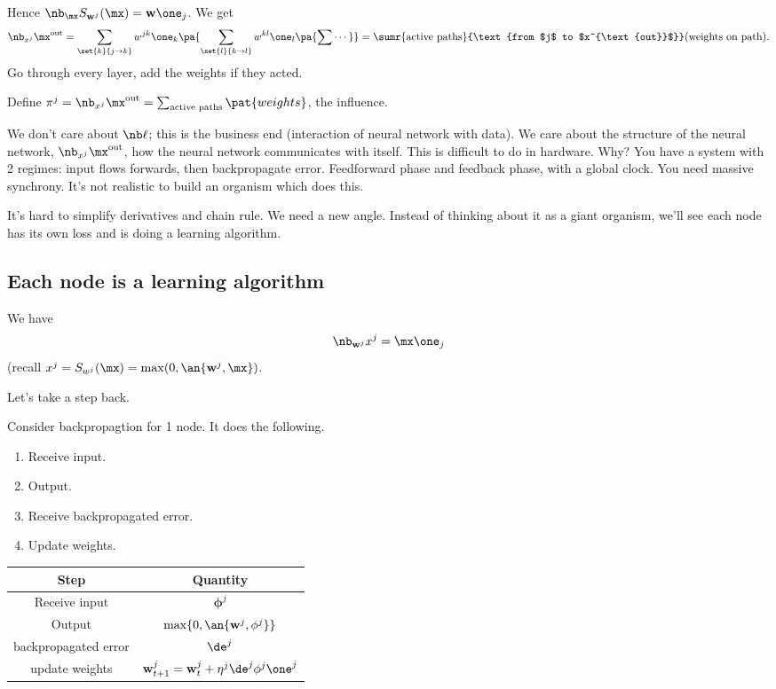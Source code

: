 Hence $\nb_{\mx} S_{\mathbf w^j}(\mx)=\mathbf w\one_j$.
We get
\[
\nb_{x^j} \mx^{\text{out}}= \sum_{\set{k}{j\to k}} w^{jk} \one_k \pa{\sum_{\set{l}{k\to l}} w^{kl}\one_l\pa{\sum\cdots}}=\sumr{\text{active paths}}{\text{from $j$ to $x^{\text{out}}$}} (\text{weights on path}). 
\]
Go through every layer, add the weights if they acted.

Define $\mathbf \pi^j=\nb_{x^j} \mx^{\text{out}}= \sum_{\text{active paths}}\pat{weights}$, the influence.

We don't care about $\nb \ell$; this is the business end (interaction of neural network with data). We care about the structure of the neural network, $\nb_{x^j}\mx^{\text{out}}$, how the neural network communicates with itself. %
This is difficult to do in hardware. Why? You have a system with 2 regimes: input flows forwards, then backpropagate error. Feedforward phase and feedback phase, with a global clock. You need massive synchrony. It's not realistic to build an organism which does this.

It's hard to simplify derivatives and chain rule. We need a new angle. Instead of thinking about it as a giant organism, we'll see each node has its own loss and is doing a learning algorithm.

\subsection{Each node is a learning algorithm}

We have 
\[
\nb_{\mathbf w^j} x^j = \mx \one_{j}
\]
(recall $x^j=S_{w^j}(\mx)=\max(0,\an{\mathbf w^j,\mx})$.

Let's take a step back. 

Consider backpropagtion for 1 node. 
It does the following.
\begin{enumerate}
\item
Receive input.
\item
Output.
\item 
Receive backpropagated error.
\item Update weights.
\end{enumerate}

%
\begin{tabular}{|c|c|}
\hline 
Step & Quantity\tabularnewline
\hline 
Receive input & $\mathbf{\phi}^{j}$\tabularnewline
\hline 
Output & $\max\{0,\an{\mathbf w^j, \mathbf \phi^j}\}$\tabularnewline
\hline 
backpropagated error & $\de^j$\tabularnewline
\hline 
update weights & $\mathbf w_{t+1}^j=\mathbf w_t^j + \eta^j \de^j\phi^j\one^j$\tabularnewline
\hline 
\end{tabular}

